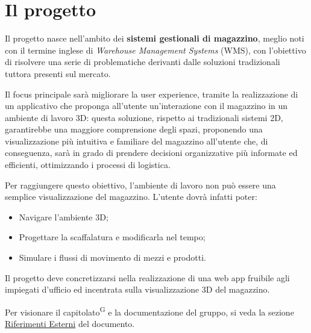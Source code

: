 \section{Il progetto}\label{sec:il_progetto}
\par Il progetto nasce nell'ambito dei \textbf{sistemi gestionali di magazzino}, meglio noti con il termine inglese di \textit{Warehouse Management Systems} (WMS), con l'obiettivo di risolvere una serie di problematiche derivanti dalle soluzioni tradizionali tuttora presenti sul mercato.
\par Il focus principale sarà migliorare la user experience, tramite la realizzazione di un applicativo che proponga all'utente un'interazione con il magazzino in un ambiente di lavoro 3D: questa soluzione, rispetto ai tradizionali sistemi 2D, garantirebbe una maggiore comprensione degli spazi, proponendo una visualizzazione più intuitiva e familiare del magazzino all'utente che, di conseguenza, sarà in grado di prendere decisioni organizzative più informate ed efficienti, ottimizzando i processi di logistica.
\par Per raggiungere questo obiettivo, l'ambiente di lavoro non può essere una semplice visualizzazione del magazzino. L'utente dovrà infatti poter:
\begin{itemize}
    \item Navigare l'ambiente 3D;
    \item Progettare la scaffalatura e modificarla nel tempo;
    \item Simulare i flussi di movimento di mezzi e prodotti.
\end{itemize}
Il progetto deve concretizzarsi nella realizzazione di una web app fruibile agli impiegati d'ufficio ed incentrata sulla visualizzazione 3D del magazzino.
\par Per visionare il capitolato\textsuperscript{G} e la documentazione del gruppo, si veda la sezione \hyperref[sec:riferimenti_esterni]{Riferimenti Esterni} del documento.

\newpage
